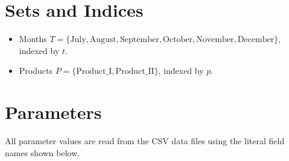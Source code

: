 \section*{Sets and Indices}

\begin{itemize}
    \item Months \(T=\{\text{July},\text{August},\text{September},\text{October},\text{November},\text{December}\}\), indexed by \(t\).
    \item Products \(P=\{\text{Product\_I},\text{Product\_II}\}\), indexed by \(p\).
\end{itemize}

\section*{Parameters}

All parameter values are read from the CSV data files using the literal field names shown below.

